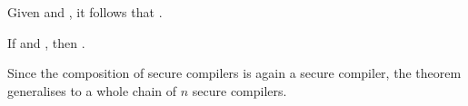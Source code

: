 \documentclass[dvipsnames]{llncs}
\begin{document}
Given  and , it follows that .

\begin{theorem}\label{thm:rtp}
  If  and , then . \Coqed
\end{theorem}

Since the composition of secure compilers is again a secure compiler, the theorem generalises to a whole chain of $n$ secure compilers.
\end{document}
